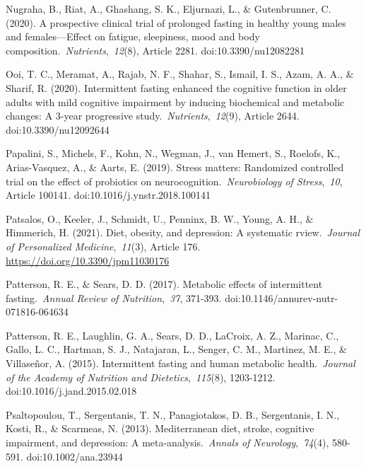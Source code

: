 \documentclass[authordate, empirical]{jote-new-article}
\begin{document}
Nugraha, B., Riat, A., Ghashang, S. K., Eljurnazi, L., \& Gutenbrunner, C. (2020). A prospective clinical trial of prolonged fasting in healthy young males and females—Effect on fatigue, sleepiness, mood and body composition. \emph{Nutrients}, \emph{12}(8), Article 2281. doi:10.3390/nu12082281



Ooi, T. C., Meramat, A., Rajab, N. F., Shahar, S., Ismail, I. S., Azam, A. A., \& Sharif, R. (2020). Intermittent fasting enhanced the cognitive function in older adults with mild cognitive impairment by inducing biochemical and metabolic changes: A 3-year progressive study. \emph{Nutrients}, \emph{12}(9), Article 2644. doi:10.3390/nu12092644



Papalini, S., Michels, F., Kohn, N., Wegman, J., van Hemert, S., Roelofs, K., Arias-Vasquez, A., \& Aarts, E. (2019). Stress matters: Randomized controlled trial on the effect of probiotics on neurocognition. \emph{Neurobiology of Stress}, \emph{10}, Article 100141. doi:10.1016/j.ynstr.2018.100141



Patsalos, O., Keeler, J., Schmidt, U., Penninx, B. W., Young, A. H., \& Himmerich, H. (2021). Diet, obesity, and depression: A systematic rview. \emph{Journal of Personalized Medicine}, \emph{11}(3), Article 176. \href{https://doi.org/10.3390/jpm11030176}{https://doi.org/10.3390/jpm11030176}



Patterson, R. E., \& Sears, D. D. (2017). Metabolic effects of intermittent fasting. \emph{Annual Review of Nutrition}, \emph{37}, 371-393. doi:10.1146/annurev-nutr-071816-064634



Patterson, R. E., Laughlin, G. A., Sears, D. D., LaCroix, A. Z., Marinac, C., Gallo, L. C., Hartman, S. J., Natajaran, L., Senger, C. M., Martinez, M. E., \& Villaseñor, A. (2015). Intermittent fasting and human metabolic health. \emph{Journal of the Academy of Nutrition and Dietetics}, \emph{115}(8), 1203-1212. doi:10.1016/j.jand.2015.02.018



Psaltopoulou, T., Sergentanis, T. N., Panagiotakos, D. B., Sergentanis, I. N., Kosti, R., \& Scarmeas, N. (2013). Mediterranean diet, stroke, cognitive impairment, and depression: A meta-analysis. \emph{Annals of Neurology}, \emph{74}(4), 580-591. doi:10.1002/ana.23944
\end{document}

